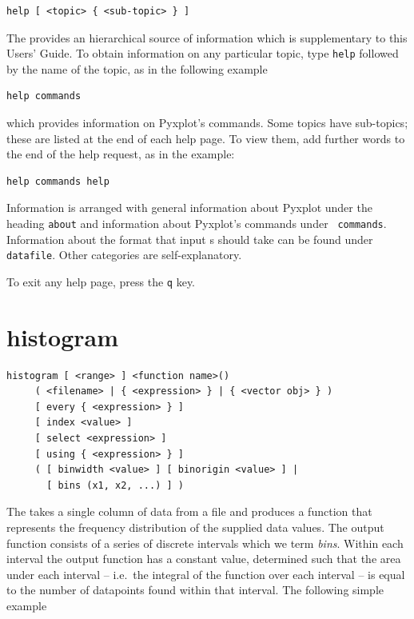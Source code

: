 \begin{verbatim}
help [ <topic> { <sub-topic> } ]
\end{verbatim}

The  provides an hierarchical source of information which is
supplementary to this Users' Guide.  To obtain information on any particular
topic, type {\tt help} followed by the name of the topic, as in the following
example

\begin{verbatim}
help commands
\end{verbatim}

\noindent which provides information on Pyxplot's commands. Some topics have
sub-topics; these are listed at the end of each help page. To view them, add
further words to the end of the help request, as in the example:

\begin{verbatim}
help commands help
\end{verbatim}

Information is arranged with general information about Pyxplot under the
heading {\tt about} and information about Pyxplot's commands under {\tt
commands}.  Information about the format that input \datafile s should take can
be found under {\tt datafile}.  Other categories are self-explanatory.

To exit any help page, press the {\tt q} key.


\section{histogram}

\begin{verbatim}
histogram [ <range> ] <function name>()
     ( <filename> | { <expression> } | { <vector obj> } )
     [ every { <expression> } ]
     [ index <value> ]
     [ select <expression> ]
     [ using { <expression> } ]
     ( [ binwidth <value> ] [ binorigin <value> ] |
       [ bins (x1, x2, ...) ] )
\end{verbatim}

The  takes a single column of data from a file and produces
a function that represents the frequency distribution of the supplied data
values. The output function consists of a series of discrete intervals which we
term {\it bins}. Within each interval the output function has a constant value,
determined such that the area under each interval -- i.e.\ the integral of the
function over each interval -- is equal to the number of datapoints found
within that interval.  The following simple example


